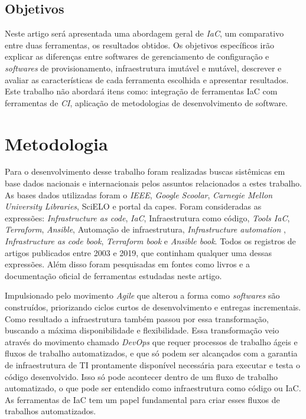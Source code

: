 \subsection{Objetivos}

Neste artigo será apresentada uma abordagem geral de \textit{IaC}, um comparativo entre duas ferramentas, os resultados obtidos. Os objetivos específicos irão explicar as diferenças entre softwares de gerenciamento de configuração e \textit{softwares} de provisionamento, infraestrutura imutável e mutável, descrever e avaliar as características de cada ferramenta escolhida e apresentar resultados. Este trabalho não abordará itens como: integração de ferramentas IaC com ferramentas de \textit{CI}, aplicação de metodologias de desenvolvimento de software.


\section{\esp Metodologia}

Para o desenvolvimento desse trabalho foram realizadas buscas sistêmicas em base dados nacionais e internacionais pelos assuntos relacionados a estes trabalho. As bases dados utilizadas foram o \textit{IEEE}, \textit{Google Scoolar}, \textit{Carnegie Mellon University Libraries}, SciELO e portal da capes. Foram consideradas as expressões:  \textit{Infrastructure as code}, \textit{IaC}, Infraestrutura como código, \textit{Tools IaC}, \textit{Terraform}, \textit{Ansible}, Automação de infraestrutura, \textit{Infrastructure automation} , \textit{Infrastructure as code book}, \textit{Terraform book} e \textit{Ansible book}. Todos os registros de artigos publicados entre 2003 e 2019, que continham qualquer uma dessas expressões. Além disso foram pesquisadas em fontes como livros e a documentação oficial de ferramentas estudadas neste artigo.  

Impulsionado pelo movimento \textit{Agile} que alterou a forma como \textit{softwares} são construídos, priorizando ciclos curtos de desenvolvimento e entregas incrementais. Como resultado a infraestrutura também passou por essa transformação, buscando a máxima disponibilidade e flexibilidade. Essa transformação veio através do movimento chamado \textit{DevOps} que requer processos de trabalho ágeis e fluxos de trabalho automatizados, e que só podem ser alcançados com a garantia de infraestrutura de TI prontamente disponível necessária para executar e testa o código desenvolvido. Isso só pode acontecer dentro de um fluxo de trabalho automatizado, o que pode ser entendido como infraestrutura como código ou IaC. As ferramentas de IaC tem um papel fundamental para criar esses fluxos de trabalhos automatizados.

